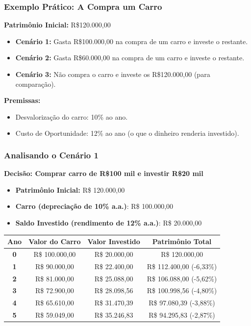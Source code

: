 \begin{frame}[c]\frametitle{Exemplo Prático: A Compra um Carro}
  \textbf{Patrimônio Inicial:} R\$120.000,00

  \begin{itemize}
    \item \textbf{Cenário 1:} Gasta R\$100.000,00 na compra de um carro e investe o restante.
    \item \textbf{Cenário 2:} Gasta R\$60.000,00 na compra de um carro e investe o restante.
    \item \textbf{Cenário 3:} Não compra o carro e investe os R\$120.000,00 (para comparação).
  \end{itemize}

  \textbf{Premissas:}
  \begin{itemize}
    \item Desvalorização do carro: 10\% ao ano.
    \item Custo de Oportunidade: 12\% ao ano (o que o dinheiro renderia investido).
  \end{itemize}
\end{frame}

\begin{frame}[c]\frametitle{Analisando o Cenário 1}
  \textbf{Decisão: Comprar carro de R\$100 mil e investir R\$20 mil}
  \begin{itemize}
    \item \textbf{Patrimônio Inicial:} R\$ 120.000,00
    \item \textbf{Carro (depreciação de 10\% a.a.)}: R\$ 100.000,00
    \item \textbf{Saldo Investido (rendimento de 12\% a.a.)}: R\$ 20.000,00
  \end{itemize}
  \begin{center}
    \begin{tabular}{|c|c|c|c|}
      \hline
      \textbf{Ano} & \textbf{Valor do Carro} & \textbf{Valor Investido} & \textbf{Patrimônio Total} \\
      \hline
      \textbf{0}   & R\$ 100.000,00          & R\$ 20.000,00            & R\$ 120.000,00            \\
      \textbf{1}   & R\$ 90.000,00           & R\$ 22.400,00            & R\$ 112.400,00 (-6,33\%)  \\
      \textbf{2}   & R\$ 81.000,00           & R\$ 25.088,00            & R\$ 106.088,00 (-5,62\%)  \\
      \textbf{3}   & R\$ 72.900,00           & R\$ 28.098,56            & R\$ 100.998,56 (-4,80\%)  \\
      \textbf{4}   & R\$ 65.610,00           & R\$ 31.470,39            & R\$ 97.080,39  (-3,88\%)  \\
      \textbf{5}   & R\$ 59.049,00           & R\$ 35.246,83            & R\$ 94.295,83  (-2,87\%)  \\
      \hline
    \end{tabular}
  \end{center}
\end{frame}

